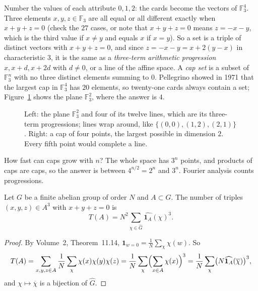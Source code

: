 Number the values of each attribute $0,1,2$: the cards become the vectors of $\mathbb F_3^4$. Three elements $x,y,z\in\mathbb F_3$ are all
equal or all different exactly when $x+y+z=0$ (check the $27$ cases, or note that $x+y+z=0$ means $z=-x-y$, which is the third value
if $x\ne y$ and equals $x$ if $x=y$). So a set is a triple of distinct vectors with $x+y+z=0$, and since $z=-x-y=x+2(y-x)$ in
characteristic $3$, it is the same as a \emph{three-term arithmetic progression} $x,x+d,x+2d$ with $d\ne0$, or a line of the affine space.
A \emph{cap set} is a subset of $\mathbb F_3^n$ with no three distinct elements summing to $0$. Pellegrino showed in 1971 that the largest cap in
$\mathbb F_3^4$ has $20$ elements, so twenty-one cards always contain a set; Figure~\ref{fig:cap} shows the plane $\mathbb F_3^2$, where the answer is $4$.

\begin{figure}[ht]
\centering
{}
\caption{Left: the plane $\mathbb F_3^2$ and four of its twelve lines, which are its three-term progressions; lines wrap around, like
$\{(0,0),(1,2),(2,1)\}$. Right: a cap of four points, the largest possible in dimension $2$. Every fifth point would complete a line.}
\label{fig:cap}
\end{figure}

How fast can caps grow with $n$? The whole space has $3^n$ points, and products of caps are caps, so the answer is between
$4^{n/2}=2^n$ and $3^n$. Fourier analysis counts progressions.

\begin{lemma}\label{lem:capcount}
Let $G$ be a finite abelian group of order $N$ and $A\subset G$. The number of triples $(x,y,z)\in A^3$ with $x+y+z=0$ is
\[T(A)=N^2\sum_{\chi\in\widehat G}\widehat{\mathbf 1_A}(\chi)^3.\]
\end{lemma}
\begin{proof}
By Volume~2, Theorem~11.14, $\mathbf 1_{w=0}=\frac1N\sum_\chi\chi(w)$. So
\[T(A)=\sum_{x,y,z\in A}\frac1N\sum_\chi\chi(x)\chi(y)\chi(z)=\frac1N\sum_\chi\Bigl(\sum_{x\in A}\chi(x)\Bigr)^3=\frac1N\sum_\chi\bigl(N\widehat{\mathbf 1_A}(\overline\chi)\bigr)^3,\]
and $\chi\mapsto\overline\chi$ is a bijection of $\widehat G$.
\end{proof}


